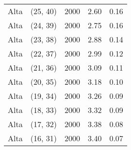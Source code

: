 \begin{tabular}{c c c c c}
Alta & (25, 40) &  2000 & 2.60 & 0.16 \\
Alta & (24, 39) &  2000 & 2.75 & 0.16 \\
Alta & (23, 38) &  2000 & 2.88 & 0.14 \\
Alta & (22, 37) &  2000 & 2.99 & 0.12 \\
Alta & (21, 36) &  2000 & 3.09 & 0.11 \\
Alta & (20, 35) &  2000 & 3.18 & 0.10 \\
Alta & (19, 34) &  2000 & 3.26 & 0.09 \\
Alta & (18, 33) &  2000 & 3.32 & 0.09 \\
Alta & (17, 32) &  2000 & 3.38 & 0.08 \\
Alta & (16, 31) &  2000 & 3.40 & 0.07 \\
\hline
\end{tabular}
